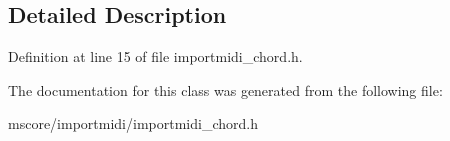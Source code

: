 \subsection{Detailed Description}


Definition at line 15 of file importmidi\+\_\+chord.\+h.



The documentation for this class was generated from the following file\+:\begin{DoxyCompactItemize}
\item 
mscore/importmidi/importmidi\+\_\+chord.\+h\end{DoxyCompactItemize}
